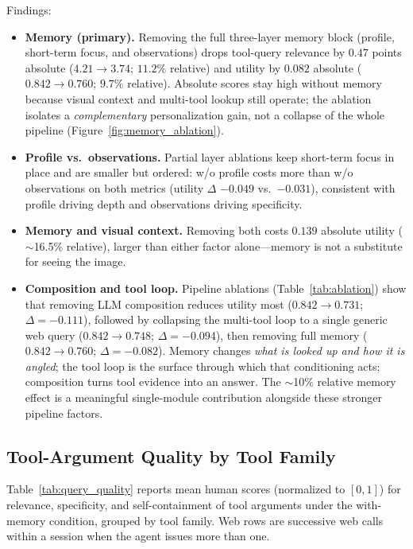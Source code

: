 \documentclass[11pt,a4paper]{article}
\begin{document}
Findings:
\begin{itemize}[leftmargin=*]
    \item \textbf{Memory (primary).} Removing the full three-layer memory block (profile, short-term focus, and observations) drops tool-query relevance by $0.47$ points absolute ($4.21\!\to\!3.74$; $11.2\%$ relative) and utility by $0.082$ absolute ($0.842\!\to\!0.760$; $9.7\%$ relative). Absolute scores stay high without memory because visual context and multi-tool lookup still operate; the ablation isolates a \emph{complementary} personalization gain, not a collapse of the whole pipeline (Figure~\ref{fig:memory_ablation}).
    \item \textbf{Profile vs.\ observations.} Partial layer ablations keep short-term focus in place and are smaller but ordered: w/o profile costs more than w/o observations on both metrics (utility $\Delta$ $-0.049$ vs.\ $-0.031$), consistent with profile driving depth and observations driving specificity.
    \item \textbf{Memory and visual context.} Removing both costs $0.139$ absolute utility ($\sim$16.5\% relative), larger than either factor alone---memory is not a substitute for seeing the image.
    \item \textbf{Composition and tool loop.} Pipeline ablations (Table~\ref{tab:ablation}) show that removing LLM composition reduces utility most ($0.842\!\to\!0.731$; $\Delta=-0.111$), followed by collapsing the multi-tool loop to a single generic web query ($0.842\!\to\!0.748$; $\Delta=-0.094$), then removing full memory ($0.842\!\to\!0.760$; $\Delta=-0.082$). Memory changes \emph{what is looked up and how it is angled}; the tool loop is the surface through which that conditioning acts; composition turns tool evidence into an answer. The $\sim$10\% relative memory effect is a meaningful single-module contribution alongside these stronger pipeline factors.
\end{itemize}

\subsection{Tool-Argument Quality by Tool Family}

Table~\ref{tab:query_quality} reports mean human scores (normalized to $[0,1]$) for relevance, specificity, and self-containment of tool arguments under the with-memory condition, grouped by tool family. Web rows are successive web calls within a session when the agent issues more than one.
\end{document}
